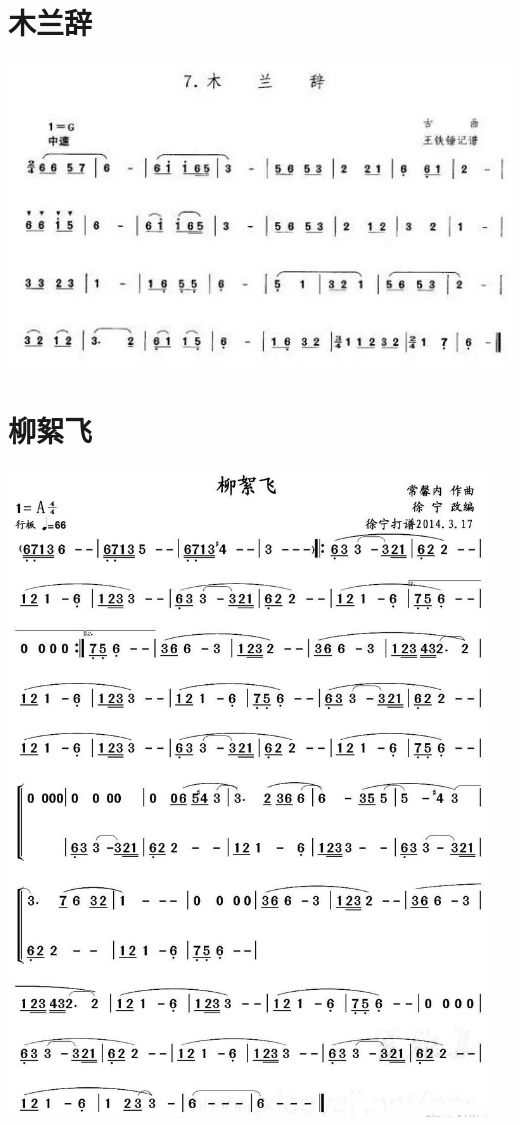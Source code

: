 \documentclass[cn,pad,twocol]{elegantbook}
\begin{document}
\section{木兰辞}\includegraphics[width=\textwidth]{dongxiao/20200819/木兰辞.jpeg}
\section{柳絮飞}\includegraphics[width=0.95\textwidth]{dongxiao/20200819/柳絮飞.jpg}
\end{document}
